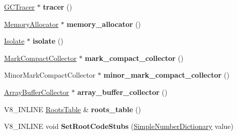 \begin{DoxyCompactItemize}
\mbox{\label{classv8_1_1internal_1_1Heap_abdd7e3821604a14452281640366cc9bb}} 
\mbox{\hyperlink{classv8_1_1internal_1_1GCTracer}{G\+C\+Tracer}} $\ast$ {\bfseries tracer} ()
\item 
\mbox{\label{classv8_1_1internal_1_1Heap_a9564c4573a66c20043a7602155074b57}} 
\mbox{\hyperlink{classv8_1_1internal_1_1MemoryAllocator}{Memory\+Allocator}} $\ast$ {\bfseries memory\+\_\+allocator} ()
\item 
\mbox{\label{classv8_1_1internal_1_1Heap_a7af0a9e8ba9409e89a980ec37a3a9f3d}} 
\mbox{\hyperlink{classv8_1_1internal_1_1Isolate}{Isolate}} $\ast$ {\bfseries isolate} ()
\item 
\mbox{\label{classv8_1_1internal_1_1Heap_af562806aafc1f078a8da45674d431c1a}} 
\mbox{\hyperlink{classv8_1_1internal_1_1MarkCompactCollector}{Mark\+Compact\+Collector}} $\ast$ {\bfseries mark\+\_\+compact\+\_\+collector} ()
\item 
\mbox{\label{classv8_1_1internal_1_1Heap_ae8588565abbe482cfa9c1134e853a7aa}} 
Minor\+Mark\+Compact\+Collector $\ast$ {\bfseries minor\+\_\+mark\+\_\+compact\+\_\+collector} ()
\item 
\mbox{\label{classv8_1_1internal_1_1Heap_a3ca09cc7380e14073d991e80547083a9}} 
\mbox{\hyperlink{classv8_1_1internal_1_1ArrayBufferCollector}{Array\+Buffer\+Collector}} $\ast$ {\bfseries array\+\_\+buffer\+\_\+collector} ()
\item 
\mbox{\label{classv8_1_1internal_1_1Heap_a5599985ae0be8802f550857da351185a}} 
V8\+\_\+\+I\+N\+L\+I\+NE \mbox{\hyperlink{classv8_1_1internal_1_1RootsTable}{Roots\+Table}} \& {\bfseries roots\+\_\+table} ()
\item 
\mbox{\label{classv8_1_1internal_1_1Heap_a8ac6459a67225fadf02536550a948784}} 
V8\+\_\+\+I\+N\+L\+I\+NE void {\bfseries Set\+Root\+Code\+Stubs} (\mbox{\hyperlink{classv8_1_1internal_1_1SimpleNumberDictionary}{Simple\+Number\+Dictionary}} value)
\item 
\mbox{\label{classv8_1_1internal_1_1Heap_a52fc780b9b566fe00513bdb3f160a6ef}} 

\end{DoxyCompactItemize}
